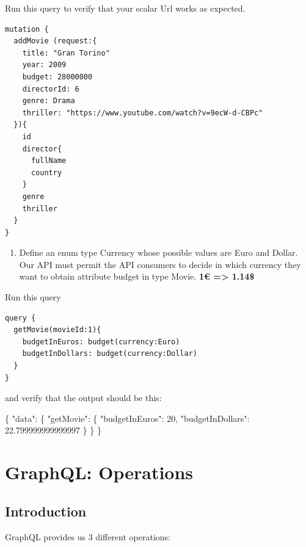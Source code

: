 \documentclass[]{book}
\newcommand{\euro}{€}
\newenvironment{Shaded}{\begin{snugshade}}{\end{snugshade}}
\newcommand{\DataTypeTok}[1]{\textcolor[rgb]{0.13,0.29,0.53}{#1}}
\newcommand{\DecValTok}[1]{\textcolor[rgb]{0.00,0.00,0.81}{#1}}
\newcommand{\FloatTok}[1]{\textcolor[rgb]{0.00,0.00,0.81}{#1}}
\newcommand{\FunctionTok}[1]{\textcolor[rgb]{0.00,0.00,0.00}{#1}}
\providecommand{\tightlist}{%
  \setlength{\itemsep}{0pt}\setlength{\parskip}{0pt}}
\begin{document}
Run this query to verify that your scalar Url works as expected.

\begin{verbatim}
mutation {
  addMovie (request:{
    title: "Gran Torino"
    year: 2009
    budget: 28000000
    directorId: 6
    genre: Drama
    thriller: "https://www.youtube.com/watch?v=9ecW-d-CBPc"
  }){
    id
    director{
      fullName
      country
    }
    genre
    thriller
  }
}
\end{verbatim}

\begin{enumerate}
\def\labelenumi{\arabic{enumi}.}
\setcounter{enumi}{3}
\tightlist
\item
  Define an enum type Currency whose possible values are Euro and
  Dollar. Our API must permit the API consumers to decide in which
  currency they want to obtain attribute budget in type Movie.
  \textbf{1\euro{} =\textgreater{} 1.14\$}
\end{enumerate}

Run this query

\begin{verbatim}
query {
  getMovie(movieId:1){
    budgetInEuros: budget(currency:Euro)
    budgetInDollars: budget(currency:Dollar)
  }
}
\end{verbatim}

and verify that the output should be this:

\begin{Shaded}
\begin{Highlighting}[]
\FunctionTok{\{}
  \DataTypeTok{"data"}\FunctionTok{:} \FunctionTok{\{}
    \DataTypeTok{"getMovie"}\FunctionTok{:} \FunctionTok{\{}
      \DataTypeTok{"budgetInEuros"}\FunctionTok{:} \DecValTok{20}\FunctionTok{,}
      \DataTypeTok{"budgetInDollars"}\FunctionTok{:} \FloatTok{22.799999999999997}
    \FunctionTok{\}}
  \FunctionTok{\}}
\FunctionTok{\}}
\end{Highlighting}
\end{Shaded}

\chapter{GraphQL: Operations}\label{graphql-operations}

\section{Introduction}\label{introduction-2}

GraphQL provides us 3 different operations:
\end{document}
